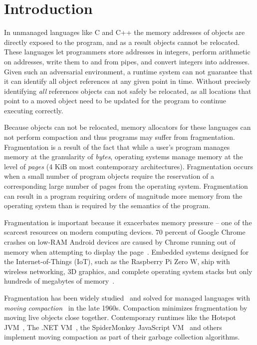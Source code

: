 \section{Introduction}
\label{sec:introduction}

In unmanaged languages like C and C++ the memory addresses of objects
are directly exposed to the program, and as a result objects cannot be
relocated.  These languages let programmers store addresses in
integers, perform arithmetic on addresses, write them to and from
pipes, and convert integers into addresses.  Given such an adversarial
environment, a runtime system can not guarantee that it can identify
all object references at any given point in time.  Without precisely
identifying \textit{all} references objects can not safely be
relocated, as all locations that point to a moved object need to be
updated for the program to continue executing correctly.

Because objects can not be relocated, memory allocators for these
languages can not perform compaction and thus programs may suffer from
fragmentation.  Fragmentation is a result of the fact that while a
user's program manages memory at the granularity of \textit{bytes},
operating systems manage memory at the level of \textit{pages} (4 KiB
on most contemporary architectures).  Fragmentation occurs when a
small number of program objects require the reservation of a
corresponding large number of pages from the operating system.
Fragmentation can result in a program requiring orders of magnitude
more memory from the operating system than is required by the
semantics of the program.

Fragmentation is important because it exacerbates memory pressure --
one of the scarcest resources on modern computing devices.  70 percent
of Google Chrome crashes on low-RAM Android devices are caused by
Chrome running out of memory when attempting to display the
page~\cite{hara:whymemory}.  Embedded systems designed for the
Internet-of-Things (IoT), such as the Raspberry Pi Zero W, ship with
wireless networking, 3D graphics, and complete operating system stacks
but only hundreds of megabytes of memory~\cite{rpi:zero}.

Fragmentation has been widely
studied~\cite{johnstone:1998:fragmentation} and solved for managed
languages with \textit{moving
  compaction}~\cite{hansen:1969:compaction,fenichel:1969:compaction}
in the late 1960s.  Compaction minimizes fragmentation by moving live
objects close together.  Contemporary runtimes like the Hotspot
JVM~\cite{microystems2006memory}, The .NET
VM~\cite{microsoft:dotnet-gc}, the SpiderMonkey JavaScript
VM~\cite{mozilla:spidermonkey-compaction} and others implement moving
compaction as part of their garbage collection algorithms.

